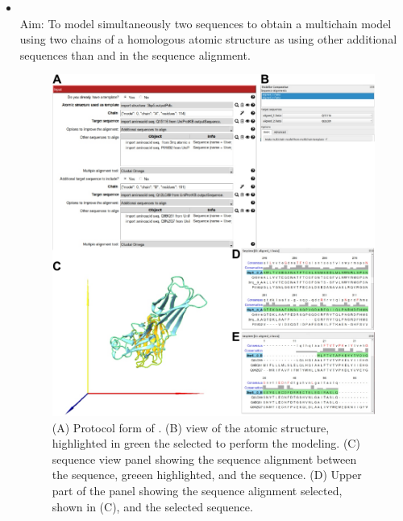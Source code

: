 \begin{itemize}
                \item {}\\
                Aim: To model simultaneously two  sequences to obtain a multichain model using two chains of a homologous atomic structure as  using other additional sequences than  and  in the sequence alignment.

 
                            \begin{figure}[H]
                            \centering 
                            \captionsetup{width=.9\linewidth} 
                            \includegraphics[width=.9\textwidth]{Images_appendix/Fig306.pdf}
                            \caption{(A) Protocol form of . (B) \chimera view of the  atomic structure, highlighted in green the  selected to perform the modeling. (C) \chimera sequence view panel showing the sequence alignment between the   sequence, greeen highlighted, and the  sequence. (D) Upper part of the \chimera {} panel showing the sequence alignment selected, shown in (C), and the selected  sequence.}  
                            \label{fig:app_protocol_seqHomology_3}
                            \end{figure}
                            

\end{itemize}
